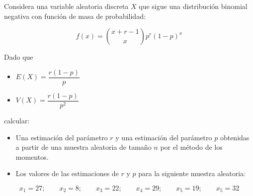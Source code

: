 \documentclass[
]{book}
\providecommand{\tightlist}{%
  \setlength{\itemsep}{0pt}\setlength{\parskip}{0pt}}
\begin{document}
Considera una variable aleatoria discreta \(X\) que sigue una distribución binomial negativa con función de masa de probabilidad:

\[f(x) = \binom{x+r-1}{x}p^r(1-p)^x\]

Dado que

\begin{itemize}
\tightlist
\item
  \(E(X)=\dfrac{r(1-p)}{p}\)
\item
  \(V(X) =\dfrac{r(1-p)}{p^2}\)
\end{itemize}

calcular:

\begin{itemize}
\item
  Una estimación del parámetro \(r\) y una estimación del parámetro \(p\) obtenidas a partir de una muestra aleatoria de tamaño \(n\) por el método de los momentos.
\item
  Los valores de las estimaciones de \(r\) y \(p\) para la siguiente muestra aleatoria:
\end{itemize}

\[x_1 = 27; \qquad   x_2 = 8; \qquad   x_3 = 22; \qquad   x_4 = 29; \qquad   x_5 = 19; \qquad   x_5 = 32\]

  
\end{document}
